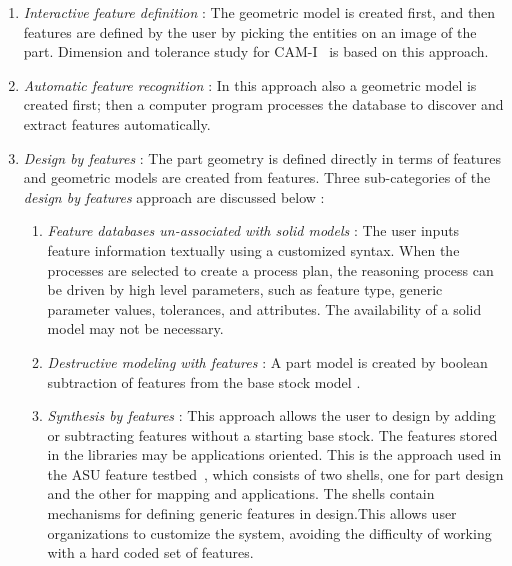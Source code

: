 	\begin{enumerate}

    \item 
	{\em Interactive feature definition} :  The geometric model is created 
		first, 
		and then features are defined by the user by picking the entities on an 
		image of the part. Dimension and tolerance study for CAM-I~\cite{john}
		is based on this approach.

    \item 
    {\em Automatic feature recognition} : In this approach also a geometric 
		model is created
		first; then a computer program processes the database to discover 
		and extract features automatically.

    \item 
    {\em Design by features} : The part geometry is defined directly in terms of
		features and  geometric models are created from features. Three 
		sub-categories of the {\it design by features} approach are discussed 
		below :

		\begin{enumerate}

    	\item 
			{\em Feature databases un-associated with solid models} :
        	The user inputs feature information textually using a customized 
			syntax.
			When the processes are selected to create a process plan, the 
			reasoning process can be driven by high level parameters, such as 
			feature type, generic parameter values, tolerances, and attributes.
 			The availability of a solid model may not be necessary.

    	\item 
			{\em Destructive modeling with features } :
        	A part model is created by boolean subtraction of features from the
			base stock model .

    	\item 
        	{\em Synthesis by features} : 
			This approach allows the user to design by adding or 
			subtracting features without a starting base stock. The features 
			stored in the libraries may be applications oriented. This is the
			approach used in the ASU feature testbed~\cite{ShahMa}, which
			consists of two shells, one for part design and the other for 
			mapping and applications. The shells contain mechanisms
			for defining generic features in design.This allows user 
			organizations to customize the system, avoiding the difficulty of 
			working with a hard coded set of features.

			\end{enumerate}

	\end{enumerate}

